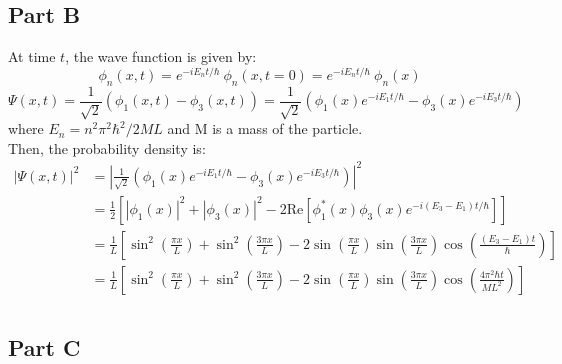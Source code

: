 \documentclass{article}
\begin{document}
\begin{adjustwidth}{5pt}{5pt}
\subsection*{Part B}
At time $t$, the wave function is given by:
\[
\phi_n(x, t) = e^{-iE_n t/\hbar}~\phi_n(x,t=0)
= e^{-iE_n t/\hbar}~\phi_n(x)
\]
\begin{equation}
\Psi(x, t) = \frac{1}{\sqrt{2}} \left( \phi_1(x,t) - \phi_3(x,t) \right)
=
\frac{1}{\sqrt{2}} \left( \phi_1(x) e^{-iE_1 t/\hbar} - \phi_3(x) e^{-iE_3 t/\hbar} \right)
\end{equation}
where $E_n = n^2 \pi^2 \hbar^2 / 2 M L$ and M is a mass of the particle.\\
Then, the probability density is:
\begin{align*}
  |\Psi(x, t)|^2 &= \left| \frac{1}{\sqrt{2}} \left( \phi_1(x) e^{-iE_1 t/\hbar} - \phi_3(x) e^{-iE_3 t/\hbar} \right) \right|^2 \\
  &= \frac{1}{2} \left[ |\phi_1(x)|^2 + |\phi_3(x)|^2 - 2 \text{Re}[\phi_1^*(x) \phi_3(x) e^{-i(E_3 - E_1) t/\hbar}] \right] \\
  &= \frac{1}{L} \left[ \sin^2 \left( \frac{\pi x}{L} \right) + \sin^2 \left( \frac{3 \pi x}{L} \right) - 2 \sin \left( \frac{\pi x}{L} \right) \sin \left( \frac{3 \pi x}{L} \right) \cos \left( \frac{(E_3 - E_1) t}{\hbar} \right) \right]\\
  &=\frac{1}{L} \left[ \sin^2 \left( \frac{\pi x}{L} \right) + \sin^2 \left( \frac{3 \pi x}{L} \right) - 2 \sin \left( \frac{\pi x}{L} \right) \sin \left( \frac{3 \pi x}{L} \right) \cos \left( \frac{4 \pi^2 \hbar t}{ML^2} \right) \right] \\
\end{align*}

\subsection*{Part C}


\end{adjustwidth}
\end{document}
